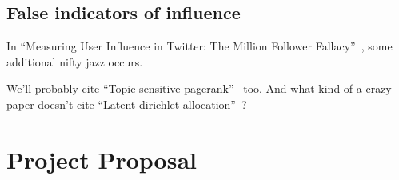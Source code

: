 \documentclass[11pt]{article}
\newcommand{\titlecite}[2]{``#1''~\cite{#2}}
\begin{document}
\subsection{False indicators of influence}
In \titlecite{Measuring User Influence in Twitter: The Million Follower Fallacy}{cha2010measuring}, 
some additional nifty jazz occurs.



We'll probably cite \titlecite{Topic-sensitive pagerank}{haveliwala2002topic} too. And what kind of a crazy
paper doesn't cite \titlecite{Latent dirichlet allocation}{blei2003latent}?

\section{Project Proposal}
{} 
\end{document}
